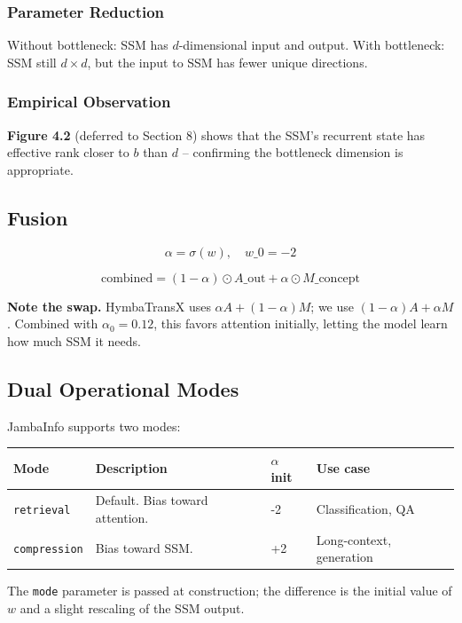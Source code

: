 \subsubsection{Parameter Reduction}

Without bottleneck: SSM has $d$-dimensional input and output.
With bottleneck: SSM still $d \times d$, but the input to SSM has fewer 
unique directions.

\subsubsection{Empirical Observation}

\textbf{Figure 4.2} (deferred to Section 8) shows that the SSM's recurrent 
state has effective rank closer to $b$ than $d$ -- confirming the 
bottleneck dimension is appropriate.

\subsection{Fusion}

\[
\alpha = \sigma(w), \quad w\_0 = -2
\tag{4.9}
\]

\[
\text{combined} = (1 - \alpha) \odot A\_\text{out} + \alpha \odot M\_\text{concept}
\tag{4.10}
\]

\textbf{Note the swap.} HymbaTransX uses $\alpha A + (1-\alpha) M$; we use 
$(1-\alpha) A + \alpha M$. Combined with $\alpha_0 = 0.12$, this favors 
attention initially, letting the model learn how much SSM it needs.

\subsection{Dual Operational Modes}

JambaInfo supports two modes:

\begin{table}[H]
\centering
\small
\begin{tabular}{llll}
\toprule
\textbf{Mode} & \textbf{Description} & \textbf{$\alpha$ init} & \textbf{Use case} \\
\midrule
\texttt{retrieval} & Default. Bias toward attention. & -2 & Classification, QA \\
\texttt{compression} & Bias toward SSM. & +2 & Long-context, generation \\
\bottomrule
\end{tabular}
\end{table}

The \texttt{mode} parameter is passed at construction; the difference is the 
initial value of $w$ and a slight rescaling of the SSM output.

